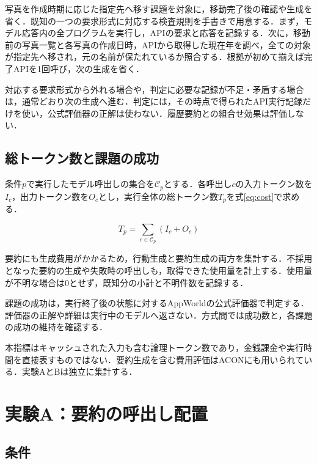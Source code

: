 \documentclass[letter]{ieicej}
\begin{document}
写真を作成時期に応じた指定先へ移す課題を対象に，移動完了後の確認や生成を省く．既知の一つの要求形式に対応する検査規則を手書きで用意する．まず，モデル応答内の全プログラムを実行し，APIの要求と応答を記録する．次に，移動前の写真一覧と各写真の作成日時，APIから取得した現在年を調べ，全ての対象が指定先へ移され，元の名前が保たれているか照合する．根拠が初めて揃えば完了APIを1回呼び，次の生成を省く．

対応する要求形式から外れる場合や，判定に必要な記録が不足・矛盾する場合は，通常どおり次の生成へ進む．判定には，その時点で得られたAPI実行記録だけを使い，公式評価器の正解は使わない．履歴要約との組合せ効果は評価しない．

\newpage
\begin{samepage}
\subsection{総トークン数と課題の成功}

条件$p$で実行したモデル呼出しの集合を$\mathcal C_p$とする．各呼出し$c$の入力トークン数を$I_c$，出力トークン数を$O_c$とし，実行全体の総トークン数$T_p$を\mbox{式\eqref{eq:cost}で求める．}

\begin{equation}
 T_p=\sum_{c\in\mathcal C_p}(I_c+O_c)
 \label{eq:cost}
\end{equation}

要約にも生成費用がかかるため，行動生成と要約生成の両方を集計する．不採用となった要約の生成や失敗時の呼出しも，取得できた使用量を計上する．使用量が不明な場合は0とせず，既知分の小計と不明件数を記録する．
\end{samepage}

課題の成功は，実行終了後の状態に対するAppWorld\cite{trivedi2024appworld}の公式評価器で判定する．評価器の正解や詳細は実行中のモデルへ返さない．方式間では成功数と，各課題の成功の維持を確認する．

本指標はキャッシュされた入力も含む論理トークン数であり，金銭課金や実行時間を直接表すものではない\cite{xu2026tokenpilot}．要約生成を含む費用評価はACON\cite{kang2026acon}にも用いられている．実験AとBは独立に集計する．

\section{実験A：要約の呼出し配置}

\subsection{条件}
\end{document}
